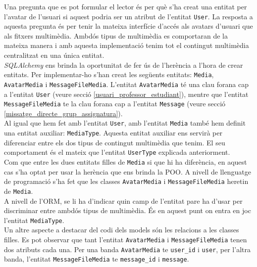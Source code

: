 	Una pregunta que es pot formular el lector és per què s'ha creat una entitat per l'avatar de l'usuari si aquest podria ser un atribut de l'entitat \texttt{User}. La resposta a aquesta pregunta és per tenir la mateixa interfície d'accés als avatars d'usuari que als fitxers multimèdia. Ambdós tipus de multimèdia es comportaran de la mateixa manera i amb aquesta implementació tenim tot el contingut multimèdia centralitzat en una única entitat.	\\
	
	\emph{SQLAlchemy} ens brinda la oportunitat de fer ús de l'herència a l'hora de crear entitats. Per implementar-ho s'han creat les següents entitats: \texttt{Media}, \texttt{AvatarMedia} i \texttt{MessageFileMedia}. L'entitat \texttt{AvatarMedia} té una clau forana cap a l'entitat \texttt{User} (veure secció \ref{usuari_professor_estudiant}), mentre que l'entitat \texttt{MessageFileMedia} te la clau forana cap a l'entitat \texttt{Message} (veure secció \ref{missatge_directe_grup_assignatura}). \\
	
    Al igual que hem fet amb l'entitat \texttt{User}, amb l'entitat \texttt{Media} també hem definit una entitat auxiliar: \texttt{MediaType}. Aquesta entitat auxiliar ens servirà per diferenciar entre els dos tipus de contingut multimèdia que tenim. El seu comportament és el mateix que l'entitat \texttt{UserType} explicada anteriorment.\\
    
    Com que entre les dues entitats filles de \texttt{Media} si que hi ha diferència, en aquest cas s'ha optat per usar la herència que ens brinda la \ac{POO}. A nivell de llenguatge de programació s'ha fet que les classes \texttt{AvatarMedia} i \texttt{MessageFileMedia} heretin de \texttt{Media}.\\
    
     A nivell de l'\ac{ORM}, se li ha d'indicar quin camp de l'entitat pare ha d'usar per discriminar entre ambdós tipus de multimèdia. És en aquest punt on entra en joc l'entitat \texttt{MediaType}.\\
    
    Un altre aspecte a destacar del codi dels models són les relacions a les classes filles. Es pot observar que tant l'entitat \texttt{AvatarMedia} i \texttt{MessageFileMedia} tenen dos atributs cada una. Per una banda \texttt{AvatarMedia} te \texttt{user\_id} i \texttt{user}, per l'altra banda, l'entitat \texttt{MessageFileMedia} te \texttt{message\_id} i \texttt{message}. \\
    
